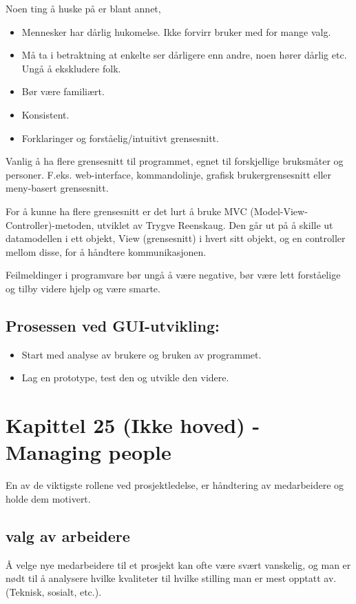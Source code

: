 \documentclass[11pt]{article}
\begin{document}
   Noen ting å huske på er blant annet,

\begin{itemize}
\item Mennesker har dårlig hukomelse. Ikke forvirr bruker med for mange valg.
\item Må ta i betraktning at enkelte ser dårligere enn andre, noen hører dårlig etc. Ungå å ekskludere folk.
\item Bør være familiært.
\item Konsistent.
\item Forklaringer og forståelig/intuitivt grensesnitt.
\end{itemize}

  Vanlig å ha flere grensesnitt til programmet, 
  egnet til forskjellige bruksmåter og personer. F.eks. web-interface, 
  kommandolinje, grafisk brukergrensesnitt eller meny-basert grensesnitt.

  For å kunne ha flere grensesnitt er det lurt å bruke MVC (Model-View-Controller)-metoden, utviklet av Trygve Reenskaug. 
  Den går ut på å skille ut datamodellen i ett objekt, View (grensesnitt) i hvert sitt objekt, 
  og en controller mellom disse, for å håndtere kommunikasjonen.

  Feilmeldinger i programvare bør ungå å være negative, bør være lett forståelige og tilby videre hjelp og være smarte.
\subsection{Prosessen ved GUI-utvikling:}
\label{sec-14.2}

\begin{itemize}
\item Start med analyse av brukere og bruken av programmet.
\item Lag en prototype, test den og utvikle den videre.
\end{itemize}
\section{Kapittel 25 (Ikke hoved) - Managing people}
\label{sec-15}

  En av de viktigste rollene ved prosjektledelse, er håndtering av medarbeidere og holde dem motivert.
\subsection{valg av arbeidere}
\label{sec-15.1}

  Å velge nye medarbeidere til et prosjekt kan ofte være svært vanskelig, 
  og man er nødt til å analysere hvilke kvaliteter til hvilke stilling man 
  er mest opptatt av. (Teknisk, sosialt, etc.).
\end{document}
